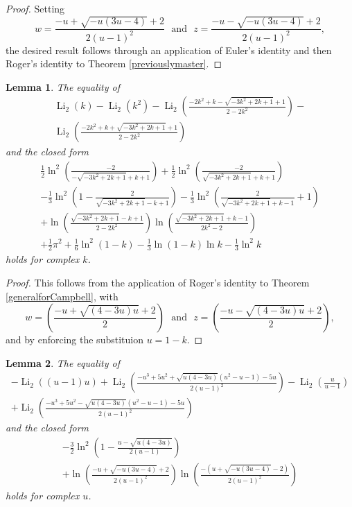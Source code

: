 \documentclass[12pt]{article}
\newtheorem{lemma}{Lemma}%
\begin{document}
\begin{proof}
 Setting $$w = \frac{-u + \sqrt{-u (3 u - 4)} + 2}{2 (u - 1)^2} \ \ \ \text{and} \ \ \ z = \frac{-u - \sqrt{-u (3 u - 4)} + 2}{2 (u - 
 1)^2}, $$ the desired result follows through an application of Euler's identity and then Roger's identity to 
 Theorem \ref{previouslymaster}. 
\end{proof}

\begin{lemma}\label{previously10p4}
 The equality of 
\begin{multline*}
 \operatorname{Li}_2(k) - \operatorname{Li}_2(k^2) 
 - \operatorname{Li}_2\left(\frac{-2k^2 + k - \sqrt{-3k^2 + 2k + 1} + 1}{2 - 2k^2}\right) - \\ 
 \operatorname{Li}_2\left(\frac{-2k^2 + k + \sqrt{-3k^2 + 2k + 1} + 1}{2 - 2k^2}\right) 
\end{multline*}
 and the closed form 
\begin{multline*}
\frac{1}{2} \ln^2\left(\frac{-2}{-\sqrt{-3k^2 + 2k + 1} + k + 1}\right) 
+ \frac{1}{2} \ln^2\left(\frac{-2}{\sqrt{-3k^2 + 2k + 1} + k + 1}\right)\\ 
- \frac{1}{3} \ln^2\left(1 - \frac{2}{\sqrt{-3k^2 + 2k + 1} - k + 1}\right)
- \frac{1}{3} \ln^2\left(\frac{2}{\sqrt{-3k^2 + 2k + 1} + k - 1} + 1\right) \\
+ \ln\left(\frac{\sqrt{-3k^2 + 2k + 1} - k + 1}{2 - 2k^2}\right) 
\ln\left(\frac{\sqrt{-3k^2 + 2k + 1} + k - 1}{2k^2 - 2}\right)\\
+ \frac{1}{2} \pi^2 + \frac{1}{6} \ln^2(1 - k) - \frac{1}{3} \ln(1 - k) \ln k - \frac{1}{3} \ln^2 k
\end{multline*}
 holds for complex $k$. 
\end{lemma}

\begin{proof}
 This follows from the application of Roger's identity to Theorem \ref{generalforCampbell}, with $$w=\left(\frac{-u + 
 \sqrt{(4 - 3u)u} + 2}{2}\right) \ \ \ 
 \text{and} \ \ \ 
 z=\left(\frac{-u - \sqrt{(4 - 3u)u} + 2}{2}\right), $$ 
 and by enforcing the substituion $u=1-k$. 
\end{proof}

\begin{lemma}\label{previously10p5}
 The equality of
\begin{multline*}
 - \operatorname{Li}_2 \left( (u - 1) u \right) 
 + \operatorname{Li}_2 \left( \frac{-u^3 + 5u^2 + \sqrt{u(4 - 3u)} (u^2 - u - 1) - 5u}{2(u - 1)^2} \right) 
 - \operatorname{Li}_2 \left( \frac{u}{u - 1} \right)\\ 
 + \operatorname{Li}_2 \left( \frac{-u^3 + 5u^2 - \sqrt{u(4 - 3u)} (u^2 - u - 1) - 5u}{2(u - 1)^2} \right) 
\end{multline*}
 and the closed form 
\begin{multline*}
 - \frac{3}{2} \ln^2 \left( 1 - \frac{u - \sqrt{u(4 - 3u)}}{2(u - 1)} \right)\\ 
 + \ln \left( \frac{-u + \sqrt{-u(3u - 4)} + 2}{2(u - 1)^2} \right) 
 \ln \left( \frac{-(u + \sqrt{-u(3u - 4)} - 2)}{2(u - 1)^2} \right) 
\end{multline*}
 holds for complex $u$. 
\end{lemma}
\end{document}
